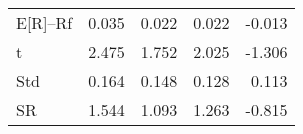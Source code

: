\begin{tabular}{lrrrr}
\toprule
\midrule
E[R]--Rf & 0.035 & 0.022 & 0.022 & -0.013 \\
t & 2.475 & 1.752 & 2.025 & -1.306 \\
Std & 0.164 & 0.148 & 0.128 & 0.113 \\
SR & 1.544 & 1.093 & 1.263 & -0.815 \\
\bottomrule
\end{tabular}
